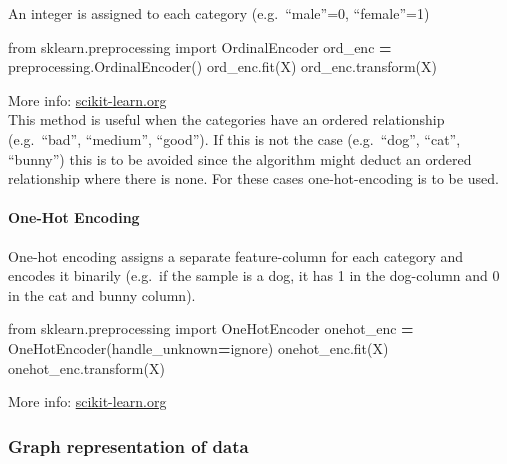 \documentclass[
]{book}
\newenvironment{Shaded}{\begin{snugshade}}{\end{snugshade}}
\newcommand{\ImportTok}[1]{#1}
\newcommand{\NormalTok}[1]{#1}
\newcommand{\OperatorTok}[1]{\textcolor[rgb]{0.81,0.36,0.00}{\textbf{#1}}}
\newcommand{\StringTok}[1]{\textcolor[rgb]{0.31,0.60,0.02}{#1}}
\begin{document}
An integer is assigned to each category (e.g.~``male''=0, ``female''=1)

\begin{Shaded}
\begin{Highlighting}[]
\ImportTok{from}\NormalTok{ sklearn.preprocessing }\ImportTok{import}\NormalTok{ OrdinalEncoder}
\NormalTok{ord\_enc }\OperatorTok{=}\NormalTok{ preprocessing.OrdinalEncoder()}
\NormalTok{ord\_enc.fit(X)}
\NormalTok{ord\_enc.transform(X)}
\end{Highlighting}
\end{Shaded}

More info:
\href{https://scikit-learn.org/stable/modules/generated/sklearn.preprocessing.OrdinalEncoder.html\#sklearn.preprocessing.OrdinalEncoder}{scikit-learn.org}\\
This method is useful when the categories have an ordered relationship
(e.g.~``bad'', ``medium'', ``good''). If this is not the case (e.g.~``dog'',
``cat'', ``bunny'') this is to be avoided since the algorithm might deduct
an ordered relationship where there is none. For these cases
one-hot-encoding is to be used.

\hypertarget{one-hot-encoding}{%
\paragraph{One-Hot Encoding}\label{one-hot-encoding}}

One-hot encoding assigns a separate feature-column for each category and
encodes it binarily (e.g.~if the sample is a dog, it has 1 in the
dog-column and 0 in the cat and bunny column).

\begin{Shaded}
\begin{Highlighting}[]
\ImportTok{from}\NormalTok{ sklearn.preprocessing }\ImportTok{import}\NormalTok{ OneHotEncoder}
\NormalTok{onehot\_enc }\OperatorTok{=}\NormalTok{ OneHotEncoder(handle\_unknown}\OperatorTok{=}\StringTok{\textquotesingle{}ignore\textquotesingle{}}\NormalTok{)}
\NormalTok{onehot\_enc.fit(X)}
\NormalTok{onehot\_enc.transform(X)}
\end{Highlighting}
\end{Shaded}

More info:
\href{https://scikit-learn.org/stable/modules/generated/sklearn.preprocessing.OneHotEncoder.html}{scikit-learn.org}\\

\hypertarget{graph-representation-of-data}{%
\subsubsection{Graph representation of data}\label{graph-representation-of-data}}
\end{document}

